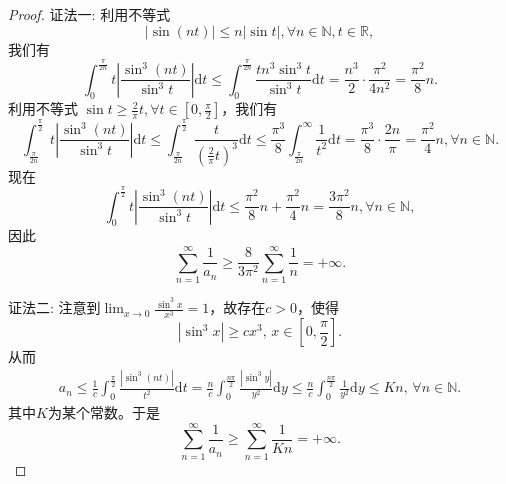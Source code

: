 \documentclass[../../main.tex]{subfiles}%
\begin{document}
\begin{proof}

{\color{blue}证法一:}
利用不等式
\[
|\sin (nt)| \leqslant n |\sin t|, \forall n \in \mathbb{N}, t \in \mathbb{R},
\]
我们有
\[
\int_{0}^{\frac{\pi}{2n}} t \left| \frac{\sin^3 (nt)}{\sin^3 t} \right| \mathrm{d}t \leqslant \int_{0}^{\frac{\pi}{2n}} \frac{t n^3 \sin^3 t}{\sin^3 t} \mathrm{d}t = \frac{n^3}{2} \cdot \frac{\pi^2}{4n^2} = \frac{\pi^2}{8} n.
\]
利用不等式 \( \sin t \geqslant \frac{2}{\pi} t, \forall t \in \left[ 0, \frac{\pi}{2} \right] \)，我们有
\[
\int_{\frac{\pi}{2n}}^{\frac{\pi}{2}} t \left| \frac{\sin^3 (nt)}{\sin^3 t} \right| \mathrm{d}t \leqslant \int_{\frac{\pi}{2n}}^{\frac{\pi}{2}} \frac{t}{\left( \frac{2}{\pi} t \right)^3} \mathrm{d}t \leqslant \frac{\pi^3}{8} \int_{\frac{\pi}{2n}}^{\infty} \frac{1}{t^2} \mathrm{d}t = \frac{\pi^3}{8} \cdot \frac{2n}{\pi} = \frac{\pi^2}{4} n, \forall n \in \mathbb{N}.
\]
现在
\[
\int_{0}^{\frac{\pi}{2}} t \left| \frac{\sin^3 (nt)}{\sin^3 t} \right| \mathrm{d}t \leqslant \frac{\pi^2}{8} n + \frac{\pi^2}{4} n = \frac{3\pi^2}{8} n, \forall n \in \mathbb{N},
\]
因此
\[
\sum_{n = 1}^{\infty} \frac{1}{a_n} \geqslant \frac{8}{3\pi^2} \sum_{n = 1}^{\infty} \frac{1}{n} = +\infty.
\]

{\color{blue}证法二:}
注意到$\lim_{x\rightarrow 0}\frac{\sin ^3x}{x^3}=1$，故存在$c>0$，使得
\[
|\sin^3 x| \geqslant c x^3, \, x \in \left[ 0, \frac{\pi}{2} \right].
\]
从而
\begin{align*}
a_n \leqslant \frac{1}{c} \int_0^{\frac{\pi}{2}} \frac{|\sin^3 (nt)|}{t^2} \mathrm{d}t = \frac{n}{c} \int_0^{\frac{n\pi}{2}} \frac{|\sin^3 y|}{y^2} \mathrm{d}y \leqslant \frac{n}{c} \int_0^{\frac{n\pi}{2}} \frac{1}{y^2} \mathrm{d}y \leqslant Kn, \, \forall n \in \mathbb{N}.
\end{align*}
其中$K$为某个常数。于是
\[
\sum_{n=1}^{\infty} \frac{1}{a_n} \geqslant \sum_{n=1}^{\infty} \frac{1}{Kn} = +\infty.
\]
\end{proof}
\end{document}
